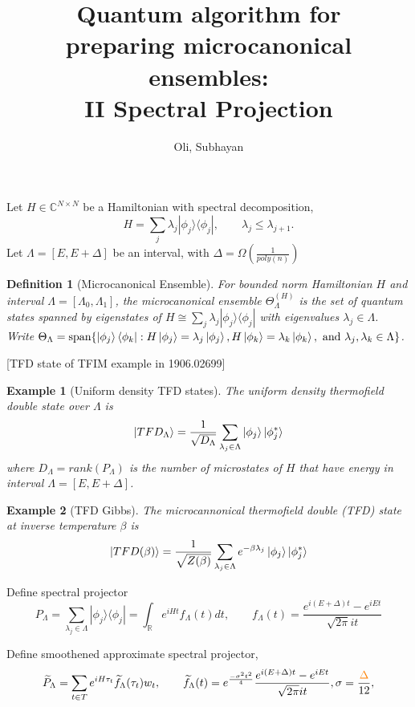\documentclass[10pt]{amsart}
\title[Quantum algorithms for preparing microcanonical ensembles]{Quantum algorithm for \\ preparing microcanonical ensembles:\\ II Spectral Projection}
\author{Oli, Subhayan}
\newtheorem{definition}{Definition}
\newtheorem{example}{Example}
\newcommand{\dmat}[1]{{| #1 \rangle \langle #1 |}}
\newcommand{\dm}[2]{\left|#1\right\rangle\left\langle#2\right|}
\begin{document}
\maketitle

Let $H \in \mathbb{C}^{N\times N}$ be a Hamiltonian with spectral decomposition, $$H = \sum_{j} \lambda_j \dmat{\phi_j}, \qquad \lambda_j \leq \lambda_{j+1}.$$ 
Let $\Lambda = [E, E+\Delta]$ be an interval, with $\Delta = \Omega(\frac{1}{poly(n)})$

\begin{definition}[Microcanonical Ensemble] 
For bounded norm Hamiltonian $H$ and interval $\Lambda=[\Lambda_0,\Lambda_1]$, the microcanonical ensemble $\Theta^{(H)}_{\Lambda}$ is the set of quantum states spanned by eigenstates of $H \cong \sum_j\lambda_j \dmat{\phi_j} $ with eigenvalues $\lambda_j \in \Lambda$. \\
Write $\Theta_{\Lambda}= \text{span}\{ \dm{\phi_j}{\phi_k} : H \ket{\phi_j} = \lambda_j \ket{\phi_j}, H \ket{\phi_k} = \lambda_k \ket{\phi_k}, \text{ and } \lambda_j,\lambda_k \in \Lambda \}$. \\ 
\end{definition}


[TFD state of TFIM example in 1906.02699] 
\begin{example}
[Uniform density TFD states] The uniform density thermofield double state  over $\Lambda$ is $$\ket{TFD_\Lambda} = \frac{1}{\sqrt{D_{\Lambda}}}\sum_{\lambda_j\in\Lambda}\ket{\phi_j}\ket{\phi_j^*}$$  
where $D_{\Lambda} = rank(P_{\Lambda})$ is the number of microstates of $H$ that have energy in interval $\Lambda=[E,E+\Delta]$.
\end{example}

\begin{example}
[TFD Gibbs]  The microcannonical thermofield double (TFD) state at inverse temperature $\beta$ is 
$$ \ket{TFD(\beta)} = \frac{1}{\sqrt{Z(\beta)}} \sum_{\lambda_j\in\Lambda} e^{-\beta \lambda_j}\ket{\phi_j}\ket{\phi_j^*}$$
\end{example}


Define spectral projector 
$$P_{\Lambda} = \sum_{\lambda_j \in \Lambda} \dmat{\phi_j} = \int_{\mathbb{R}} e^{iHt} f_{\Lambda}(t) dt, \qquad f_{\Lambda}(t) = \frac{e^{i(E+\Delta)t}-e^{iE t}}{\sqrt{2\pi}it}$$

Define smoothened approximate spectral projector,
$$\widetilde{P}_{\Lambda} =  \sum_{t\in T} e^{iH \tau_t} \widetilde{f}_{\Lambda}(\tau_t) w_t, \qquad \widetilde{f}_{\Lambda}(t) = e^{\frac{-\sigma^2 t^2 }{4} }\frac{e^{i(E+\Delta)t}-e^{i E t}}{\sqrt{2\pi} it}, \sigma=\frac{\textcolor{orange}{\Delta}}{12},$$
\end{document}
